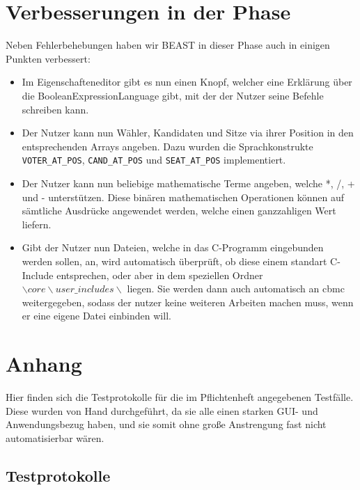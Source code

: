 \documentclass[a4paper]{scrreprt}
\begin{document}
\chapter{Verbesserungen in der Phase}
Neben Fehlerbehebungen haben wir BEAST in dieser Phase auch in einigen Punkten
verbessert:

\begin{itemize}
  \item Im Eigenschafteneditor gibt es nun einen Knopf, welcher eine Erklärung
  über die BooleanExpressionLanguage gibt, mit der der Nutzer seine Befehle
  schreiben kann.
  \item Der Nutzer kann nun Wähler, Kandidaten und Sitze via ihrer Position in den entsprechenden Arrays angeben. Dazu wurden die Sprachkonstrukte \verb!VOTER_AT_POS!, \verb!CAND_AT_POS! und \verb!SEAT_AT_POS! implementiert.
  \item Der Nutzer kann nun beliebige mathematische Terme angeben, welche *, /, + und - unterstützen. Diese binären mathematischen Operationen können auf sämtliche Ausdrücke angewendet werden, welche einen ganzzahligen Wert liefern.
  \item Gibt der Nutzer nun Dateien, welche in das C-Programm eingebunden werden
  sollen, an, wird automatisch überprüft, ob diese einem standart C-Include
  entsprechen, oder aber in dem speziellen Ordner $\backslash core \backslash
  user\_includes \backslash$ liegen. Sie werden dann auch automatisch an cbmc
  weitergegeben, sodass der nutzer keine weiteren Arbeiten machen muss, wenn er
  eine eigene Datei einbinden will.
\end{itemize}

\chapter{Anhang}

Hier finden sich die Testprotokolle für die im Pflichtenheft angegebenen
Testfälle. Diese wurden von Hand durchgeführt, da sie alle einen starken GUI- und
Anwendungsbezug haben, und sie somit ohne große Anstrengung fast nicht
automatisierbar wären.

\section{Testprotokolle} 















\end{document}
